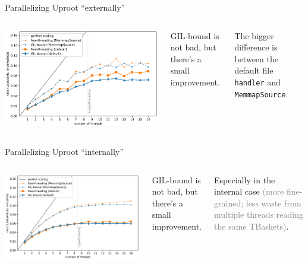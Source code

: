 \documentclass[aspectratio=169]{beamer}
\begin{document}
\begin{frame}{Parallelizing Uproot ``externally''}
\large
\vspace{0.5 cm}
\begin{columns}
\includegraphics[width=\linewidth]{img/scaling-of-uproot-external.pdf}

GIL-bound is not bad, but there's a small improvement.

\vspace{0.5 cm}
The bigger difference is between the default file \texttt{handler} and \texttt{MemmapSource}.

\vspace{\baselineskip}
\end{columns}
\end{frame}

\begin{frame}{Parallelizing Uproot ``internally''}
\large
\vspace{0.5 cm}
\begin{columns}
\includegraphics[width=\linewidth]{img/scaling-of-uproot-internal.pdf}

GIL-bound is not bad, but there's a small improvement.

\vspace{0.5 cm}
Especially in the internal case \textcolor{gray}{(more fine-grained; less waste from multiple threads reading the same TBaskets)}.
\end{columns}
\end{frame}
\end{document}
